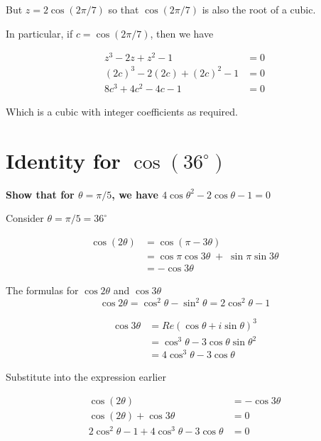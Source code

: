 \documentclass[11pt]{amsart}
\begin{document}
But $z = 2 \cos (2 \pi / 7)$ so that $\cos (2 \pi / 7)$ is also the root of a cubic.

In particular, if $c = \cos (2 \pi / 7)$, then we have

$$
\begin{aligned}
z^{3} - 2 z + z^{2 } - 1 &= 0
\\
(2 c)^{3} - 2 (2c) + (2c)^{2 } - 1 
&= 0
\\
8 c^{3} + 4c^{2} - 4c  - 1 
&= 0
\end{aligned}
$$

Which is a cubic with integer coefficients as required.



\section{Identity for $\cos (36^{\circ})$}
\label{sec:piOverFiveIdentity}

\textbf{
Show that for $\theta = \pi / 5$, we have $4 \cos \theta^2 - 2 \cos \theta - 1 = 0$
}

\vspace{1em}

Consider $\theta = \pi / 5 =  36^{\circ}$ 

$$
\begin{aligned}
\cos(2 \theta) &= 
\cos(\pi - 3 \theta)
\\ 
&= \cos \pi \cos 3 \theta  \; + \; \sin \pi \sin 3 \theta
\\
&= - \cos 3 \theta
\end{aligned}
$$

The formulas for $\cos 2 \theta$ and $\cos 3 \theta$
$$
\cos 2 \theta = \cos^2 \theta - \sin^2 \theta = 2 \cos^2 \theta - 1
$$

$$
\begin{aligned}
\cos 3 \theta &= Re ( \cos \theta + i \sin \theta)^3
\\
&=
\cos^3 \theta - 3 \cos \theta \sin \theta^2
\\
&=
4 \cos^3 \theta - 3 \cos \theta
\end{aligned}$$

Substitute into the expression earlier

$$
\begin{aligned}
\cos(2 \theta) 
&= - \cos 3 \theta
\\
\cos(2 \theta) +
 \cos 3 \theta &=0
\\
2 \cos^2 \theta - 1
+
4 \cos^3 \theta - 3 \cos \theta
&=0
\end{aligned}
$$
\end{document}

